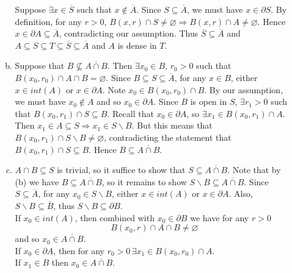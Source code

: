 \documentclass[A4paper,12pt]{article}
\theoremstyle{definition}
\numberwithin{equation}{section}
\begin{document}
\begin{enumerate}[(1)]
\begin{enumerate}[(a)]
                    Suppose $\exists x \in \overline{S}$ such that $x \not \in \overline{A}$. 
                    Since $S \subseteq \overline{A}$, we must have $x \in \partial S$.
                    By definition, for any $r>0$, $B(x, r) \cap S \neq \varnothing \Rightarrow B(x,r) \cap A \neq \varnothing$. Hence $x \in \partial A \subseteq \overline{A}$, contradicting our assumption. 
                    Thus $\overline{S} \subseteq \overline{A}$ and $A \subseteq S \subseteq T \subseteq \overline{S} \subseteq \overline{A}$  and $A$ is dense in $T$.
                \item
                    Suppose that $B \not \subseteq \overline{A \cap B}$. 
                    Then $\exists x_0 \in B,\, r_0 > 0$ such that $B(x_0, r_0) \cap A \cap B = \varnothing$. 
                    Since $B \subseteq S \subseteq \overline{A}$, for any $x \in B$, either $x \in int(A)$ or $x \in \partial A$. 
                    Note $x_0 \in B(x_0, r_0) \cap B$. By our assumption, we must have $x_0 \not  \in A$ and so $x_0 \in \partial A$.
                    Since $B$ is open in $S$, $\exists r_1>0$ such that $B(x_0, r_1) \cap S  \subseteq B$.
                    Recall that $x_0 \in \partial A$, so $\exists x_1 \in B(x_0, r_1) \cap A$.
                    Then $x_1 \in A \subseteq S \Rightarrow x_1 \in S \backslash B$. But this means that $B(x_0, r_1) \cap S\backslash B \neq \varnothing$, contradicting the statement that $B(x_0, r_1) \cap S  \subseteq B$.
                    Hence $B \subseteq \overline{A\cap B}$.
                \item
                    $A \cap B \subseteq S$ is trivial, so it suffice to show that $S \subseteq \overline{A\cap B}$. 
                    Note that by (b) we  have $B \subseteq \overline{A \cap B}$, so it remains to show $S\backslash B \subseteq \overline{A\cap B}$.
                    Since $S \subseteq \overline{A}$, for any $x_0 \in S\backslash B$, either $x \in int(A)$ or $x \in \partial A$.
                    Also, $S\backslash B \subseteq \overline{B}$, thus $S \backslash B \subseteq \partial B$.
                    \\If $x_0 \in int(A)$, then combined with $x_0 \in \partial B$ we have for any $r>0$
                    $$
                    B(x_0, r) \cap A \cap B \neq \varnothing
                    $$
                    and so $x_0 \in \overline{A\cap B}$.
                    \\If $x_0 \in \partial A$, then for any $r_0 > 0\, \exists x_1 \in B(x_0, r_0) \cap A$.
                    \\If $x_1 \in B$ then $x_0\in \overline{A\cap B}$.

\end{enumerate}
\end{enumerate}
\end{document}

